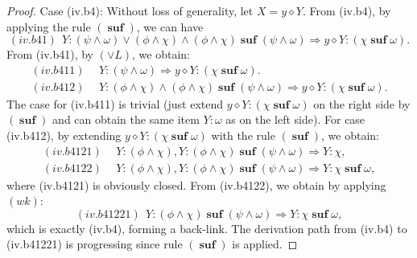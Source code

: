 \documentclass[manuscript,screen]{acmart}
\newcommand{\cat}[0]{\diamond}
\DeclareMathOperator{\osuf}{\mathbf{suf}}
\begin{document}
\begin{proof}
\ifx
Case (iv.b4): Without loss of generality, let $X = y\cat Y$.
From (iv.b4), by applying the rule $(\osuf)$, we can have
$$
(iv.b41)\ \  Y : (\psi\wedge \omega) \vee (\phi\wedge\chi)\wedge (\phi\wedge\chi)\osuf (\psi\wedge \omega)\Rightarrow y\cat Y : (\chi\osuf \omega). 
$$
From (iv.b41), by $(\vee L)$, we obtain:
$$
\begin{aligned}
(iv.b411)\ \ & Y : (\psi\wedge \omega) \Rightarrow y\cat Y : (\chi\osuf \omega).\\
(iv.b412)\ \ & Y : (\phi\wedge\chi)\wedge (\phi\wedge\chi)\osuf (\psi\wedge \omega) \Rightarrow y\cat Y : (\chi\osuf \omega).
\end{aligned}
$$
The case for (iv.b411) is trivial (just extend $y\cat Y : (\chi\osuf \omega)$ on the right side by $(\osuf)$ and can obtain the same item $Y : \omega$ as on the left side).
For case (iv.b412), by extending $y\cat Y : (\chi\osuf\omega)$ with the rule $(\osuf)$, we obtain:
$$
\begin{aligned}
(iv.b4121)\ \ & Y : (\phi\wedge\chi), Y : (\phi\wedge\chi)\osuf (\psi\wedge \omega) \Rightarrow Y : \chi,\\
(iv.b4122)\ \ & Y : (\phi\wedge\chi), Y : (\phi\wedge\chi)\osuf (\psi\wedge \omega) \Rightarrow Y : \chi\osuf \omega, 
\end{aligned}
$$
where (iv.b4121) is obviously closed.
From (iv.b4122), we obtain by applying $(wk)$:
$$
(iv.b41221)\ \ Y : (\phi\wedge\chi)\osuf (\psi\wedge \omega) \Rightarrow Y : \chi\osuf \omega, 
$$
which is exactly (iv.b4), forming a back-link.
The derivation path from (iv.b4) to (iv.b41221) is progressing since rule $(\osuf)$ is applied.
\fi


\end{proof}
\end{document}
